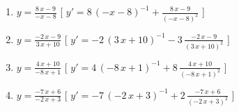 \begin{enumerate}
\begin{enumerate}
\item \(y= {\frac {8\,x-9}{-x-8}} \) \hfill [ \(y'= 8\, \left( -x-8 \right) 
^{-1}+{\frac {8\,x-9}{ \left( -x-8 \right) ^{2}}}\) ]
\item \(y= {\frac {-2\,x-9}{3\,x+10}} \) \hfill [ \(y'= -2\, \left( 3\,x+10 \right) 
^{-1}-3\,{\frac {-2\,x-9}{ \left( 3\,x+10 \right) ^{2}}}\) ]
\item \(y= {\frac {4\,x+10}{-8\,x+1}} \) \hfill [ \(y'= 4\, \left( -8\,x+1 \right) 
^{-1}+8\,{\frac {4\,x+10}{ \left( -8\,x+1 \right) ^{2}}}\) ]
\item \(y= {\frac {-7\,x+6}{-2\,x+3}} \) \hfill [ \(y'= -7\, \left( -2\,x+3 \right) 
^{-1}+2\,{\frac {-7\,x+6}{ \left( -2\,x+3 \right) ^{2}}}\) ]
\end{enumerate}

\end{enumerate}
 
 
